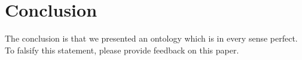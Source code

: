 \section{Conclusion}
\label{sec:conclusion}

\color{red}
The conclusion is that we presented an ontology which is in every sense perfect. To falsify this statement, please provide feedback on this paper.

\color{black}
